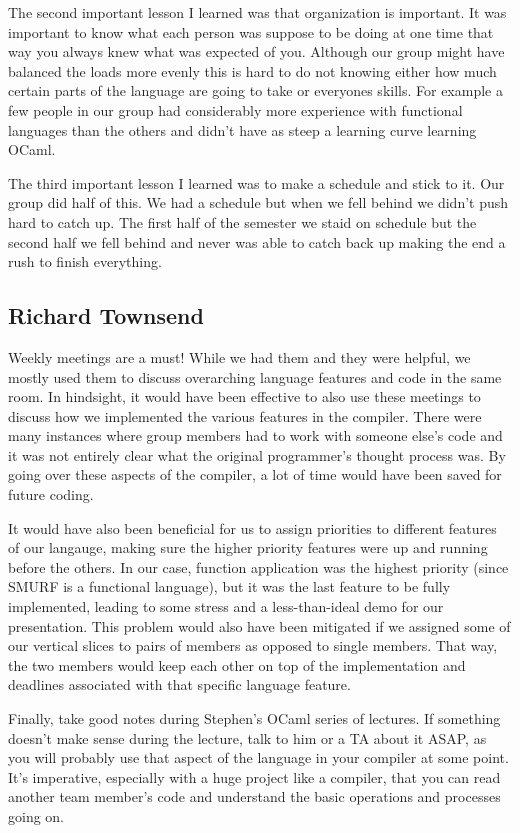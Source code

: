 The second important lesson I learned was that organization is important. It was important to know what each person was suppose 
to be doing at one time that way you always knew what was expected of you. Although our group might have balanced the loads more 
evenly this is hard to do not knowing either how much certain parts of the language are going to take or everyones skills. For 
example a few people in our group had considerably more experience with functional languages than the others and didn't have as 
steep a learning curve learning OCaml. 

The third important lesson I learned was to make a schedule and stick to it. Our group did half of this. We had a schedule but when 
we fell behind we didn't push hard to catch up. The first half of the semester we staid on schedule but the second half we fell 
behind and never was able to catch back up making the end a rush to finish everything. 

\subsection{Richard Townsend}
Weekly meetings are a must! While we had them and they were helpful, we mostly used them to discuss overarching language features and code in the same room.
In hindsight, it would have been effective to also use these meetings to discuss how we implemented the various features in the compiler. There were many
instances where group members had to work with someone else's code and it was not entirely clear what the original programmer's thought process was.
By going over these aspects of the compiler, a lot of time would have been saved for future coding.

It would have also been beneficial for us to assign priorities to different features of our langauge, making sure the higher priority features were
up and running before the others. In our case, function application was the highest priority (since SMURF is a functional language), but it was the last
feature to be fully implemented, leading to some stress and a less-than-ideal demo for our presentation. This problem would also have been mitigated if we assigned
some of our vertical slices to pairs of members as opposed to single members. That way, the two members would keep each other on top of the implementation and deadlines
associated with that specific language feature.

Finally, take good notes during Stephen's OCaml series of lectures. If something doesn't make sense during the lecture, talk to him or a TA about it ASAP, as you
will probably use that aspect of the language in your compiler at some point. It's imperative, especially with a huge project like a compiler, that you can read
another team member's code and understand the basic operations and processes going on.
